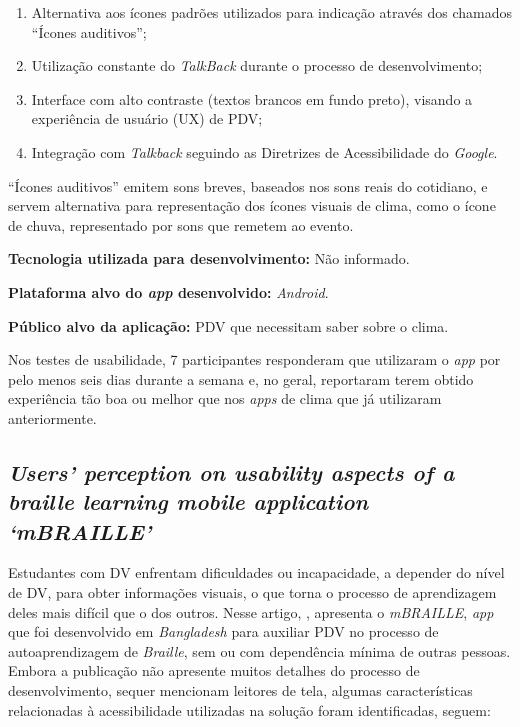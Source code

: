 \begin{enumerate}
    \item Alternativa aos ícones padrões utilizados para indicação através dos chamados ``Ícones auditivos'';
    \item Utilização constante do \emph{TalkBack} durante o processo de desenvolvimento;
    \item Interface com alto contraste (textos brancos em fundo preto), visando a experiência de usuário (UX) de PDV\@;
    \item Integração com \emph{Talkback} seguindo as Diretrizes de Acessibilidade do \emph{Google}.
\end{enumerate}

``Ícones auditivos'' emitem sons breves, baseados nos sons reais do cotidiano, e servem alternativa para representação dos ícones visuais de clima, como o ícone de chuva, representado por sons que remetem ao evento.

\textbf{Tecnologia utilizada para desenvolvimento:} Não informado.

\textbf{Plataforma alvo do \emph{app} desenvolvido:} \emph{Android}.

\textbf{Público alvo da aplicação:} PDV que necessitam saber sobre o clima\@.

Nos testes de usabilidade, 7 participantes responderam que utilizaram o \emph{app} por pelo menos seis dias durante a semana e, no geral, reportaram terem obtido experiência tão boa ou melhor que nos \emph{apps} de clima que já utilizaram anteriormente.

\subsection{\emph{Users’ perception on usability aspects of a braille learning mobile application ‘mBRAILLE’}}

Estudantes com DV enfrentam dificuldades ou incapacidade, a depender do nível de DV, para obter informações visuais, o que torna o processo de aprendizagem deles mais difícil que o dos outros.
Nesse artigo, , apresenta o \emph{mBRAILLE}, \emph{app} que foi desenvolvido em \emph{Bangladesh} para auxiliar PDV no processo de autoaprendizagem de \emph{Braille}, sem ou com dependência mínima de outras pessoas.
Embora a publicação não apresente muitos detalhes do processo de desenvolvimento, sequer mencionam leitores de tela, algumas características relacionadas à acessibilidade utilizadas na solução foram identificadas, seguem:

